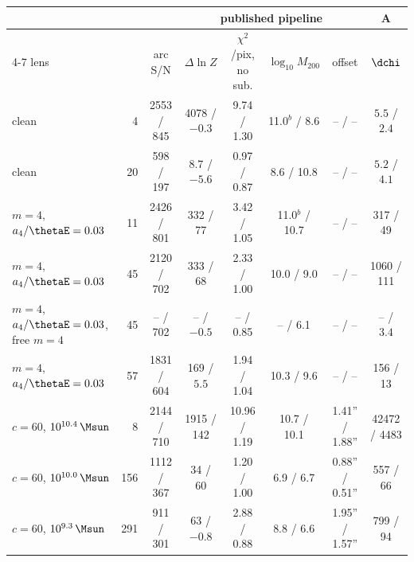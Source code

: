 \begin{tabular}{@{}lrcccccc@{}}
\toprule
 & & & \multicolumn{4}{c}{published pipeline} & A \\ \cmidrule(lr){4-7}
lens & & arc S/N & $\Delta\ln Z$ & $\chi^2$/pix, no sub. & $\log_{10}M_{200}$ & offset & $\dchi$ \\
\midrule
clean & 4 & 2553 / 845 & 4078 / $-0.3$ & 9.74 / 1.30 & 11.0$^{b}$ / 8.6 & -- / -- & $5.5$ / $2.4$ \\
clean & 20 & 598 / 197 & $8.7$ / $-5.6$ & 0.97 / 0.87 & 8.6 / 10.8 & -- / -- & $5.2$ / $4.1$ \\
$m{=}4$, $a_4/\thetaE=0.03$ & 11 & 2426 / 801 & 332 / 77 & 3.42 / 1.05 & 11.0$^{b}$ / 10.7 & -- / -- & 317 / 49 \\
$m{=}4$, $a_4/\thetaE=0.03$ & 45 & 2120 / 702 & 333 / 68 & 2.33 / 1.00 & 10.0 / 9.0 & -- / -- & 1060 / 111 \\
$m{=}4$, $a_4/\thetaE=0.03$, free $m{=}4$ & 45 & -- / 702 & -- / $-0.5$ & -- / 0.85 & -- / 6.1 & -- / -- & -- / $3.4$ \\
$m{=}4$, $a_4/\thetaE=0.03$ & 57 & 1831 / 604 & 169 / $5.5$ & 1.94 / 1.04 & 10.3 / 9.6 & -- / -- & 156 / 13 \\
$c=60$, $10^{10.4}\,\Msun$ & 8 & 2144 / 710 & 1915 / 142 & 10.96 / 1.19 & 10.7 / 10.1 & 1.41'' / 1.88'' & 42472 / 4483 \\
$c=60$, $10^{10.0}\,\Msun$ & 156 & 1112 / 367 & 34 / 60 & 1.20 / 1.00 & 6.9 / 6.7 & 0.88'' / 0.51'' & 557 / 66 \\
$c=60$, $10^{9.3}\,\Msun$ & 291 & 911 / 301 & 63 / $-0.8$ & 2.88 / 0.88 & 8.8 / 6.6 & 1.95'' / 1.57'' & 799 / 94 \\
\bottomrule
\end{tabular}
